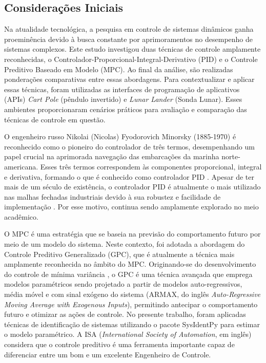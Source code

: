 \documentclass[12pt,           %
a4paper,                       %
openany,                       %
oneside,                       %
chapter=TITLE,                 %
english,                       %
spanish,                       %
brazil,                        %
sumario=tradicional]{abntex2}  %
\begin{document}
\begin{OnehalfSpace}
\section{Considerações Iniciais}
\label{sec:considIniciaisIntroducao}        %
			
Na atualidade tecnológica, a pesquisa em controle de sistemas dinâmicos ganha proeminência devido à busca constante por aprimoramentos no desempenho de sistemas complexos. Este estudo investigou duas técnicas de controle amplamente reconhecidas, o Controlador-Proporcional-Integral-Derivativo (PID) e o Controle Preditivo Baseado em Modelo (MPC). Ao final da análise, são realizadas ponderações comparativas entre essas abordagens. Para contextualizar e aplicar essas técnicas, foram utilizadas as interfaces de programação de aplicativos (APIs) \textit{Cart Pole} (pêndulo invertido) e \textit{Lunar Lander} (Sonda Lunar). Esses ambientes proporcionaram cenários práticos para avaliação e comparação das técnicas de controle em questão.

O engenheiro russo Nikolai (Nicolas) Fyodorovich Minorsky (1885-1970) é reconhecido como o pioneiro do controlador de três termos, desempenhando um papel crucial na aprimorada navegação das embarcações da marinha norte-americana. Esses três termos correspondem às componentes proporcional, integral e derivativa, formando o que é conhecido como controlador PID \citep{1922PID}. Apesar de ter mais de um século de existência, o controlador PID é atualmente o mais utilizado nas malhas fechadas industriais devido à sua robustez e facilidade de implementação \cite{deulkar2020analysis}. Por esse motivo, continua sendo amplamente explorado no meio acadêmico.

O MPC é uma estratégia que se baseia na previsão do comportamento futuro por meio de um modelo do sistema. Neste contexto, foi adotada a abordagem do Controle Preditivo Generalizado (GPC), que é atualmente a técnica mais amplamente reconhecida no âmbito do MPC. Originando-se do desenvolvimento do controle de mínima variância \cite{alba2000control}, o GPC é uma técnica avançada que emprega modelos paramétricos sendo projetado a partir de modelos auto-regressivos, média móvel e com sinal exógeno do sistema (ARMAX, do inglês \textit{Auto-Regressive Moving Average with Exogenous Inputs}), permitindo antecipar o comportamento futuro e otimizar as ações de controle. No presente trabalho, foram aplicadas técnicas de identificação de sistemas utilizando o pacote SysIdentPy \cite{lacerda2020sysidentpy} para estimar o modelo paramétrico. A ISA (\textit{International Society of Automation}, em inglês) considera que o controle preditivo é uma ferramenta importante capaz de diferenciar entre um bom e um excelente Engenheiro de Controle.


\end{OnehalfSpace}
\end{document}
